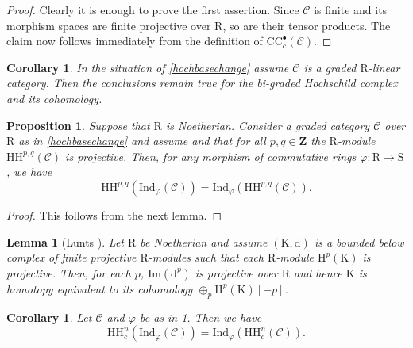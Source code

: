 \documentclass{article}
\theoremstyle{plain}
\newtheorem{corollary}[theorem]{Corollary}
\newtheorem{lemma}[theorem]{Lemma}
\newtheorem{proposition}[theorem]{Proposition}
\theoremstyle{definition}
\theoremstyle{remark}
\newcommand{\mr}{\mathrm}
\newcommand{\Cc}{\mathcal C}
\newcommand{\3}{\vspace{3mm}}
\newcommand{\2}{\vspace{2mm}}
\newcommand{\1}{\vspace{1mm}}
\begin{document}
\begin{proof}
 Clearly it is enough to prove the first assertion. Since $\Cc$ is finite and its morphism spaces are finite projective over $\mr{R}$, so are their tensor products. The claim now follows immediately from the definition of $\mr{CC}^{\bullet}_c(\Cc)$.
\end{proof}
\2
\begin{corollary}
In the situation of \cref{hochbasechange} assume $\Cc$ is a graded $\mr R$-linear category. Then the conclusions remain true for the bi-graded Hochschild complex and its cohomology.
\end{corollary}
\2
\begin{proposition}\label{extraformalityres}
 Suppose that $\mr{R}$ is Noetherian. Consider a graded category $\Cc$ over $\mr{R}$ as in \cref{hochbasechange} and assume and that for all $p,q \in \mathbf{Z}$ the $\mr{R}$-module $\mr{HH}^{p,q}(\Cc)$ is projective. Then, for any morphism of commutative rings $\varphi:\mr{R} \to \mr{S}$, we have $$\mr{HH}^{p,q}(\mr{Ind}_\varphi(\Cc)) = \mr{Ind}_\varphi(\mr{HH}^{p,q}(\Cc)).$$
\end{proposition}
\begin{proof}
 This follows from the next lemma.
\end{proof}
\begin{lemma}[Lunts \cite{MR2578584}]
 Let $\mr{R}$ be Noetherian and assume $(\mr{K},\mr{d})$ is a bounded below complex of finite projective $\mr{R}$-modules such that each $\mr{R}$-module $\mr{H}^p(\mr{K})$ is projective. Then, for each $p$, $\mr{Im}(\mr{d}^p)$ is projective over $\mr{R}$ and hence $\mr{K}$ is homotopy equivalent to its cohomology $\oplus_p \mr{H}^{p}(\mr{K})[-p]$.
\end{lemma}
\2
\begin{corollary}
Let $\Cc$ and $\varphi$ be as in \cref{extraformalityres}. Then we have $$\mr{HH}^{n}_c(\mr{Ind}_\varphi(\Cc)) = \mr{Ind}_\varphi(\mr{HH}^{n}_c(\Cc)).$$
\end{corollary}
\end{document}
